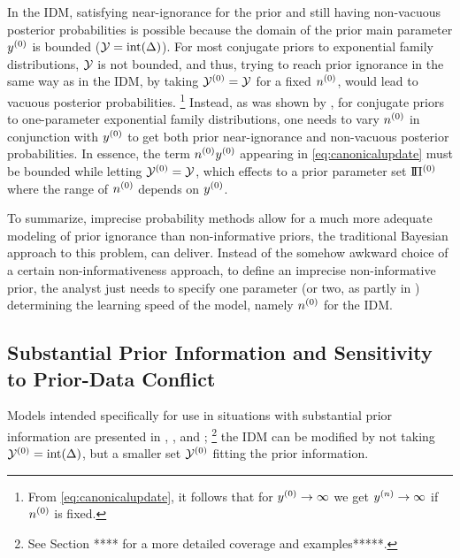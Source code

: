 In the IDM, satisfying near-ignorance for the prior and still having non-vacuous posterior probabilities is possible
because the domain of the prior main parameter $y^{(0)}$ is bounded ($\mathcal{Y} = \text{int}(\Delta)$).
For most conjugate priors to exponential family distributions, $\mathcal{Y}$ is not bounded,
and thus, trying to reach prior ignorance in the same way as in the IDM,
by taking $\mathcal{Y}^{(0)} = \mathcal{Y}$ for a fixed $n^{(0)}$, would lead to vacuous posterior probabilities.%
\footnote{From \eqref{eq:canonicalupdate}, it follows that for $y^{(0)} \rightarrow \infty$ we get $y^{(n)} \rightarrow \infty$ if $n^{(0)}$ is fixed.}
Instead, as was shown by \textcite{2012:benavolizaffalon}, for conjugate priors to one-parameter exponential family distributions,
one needs to vary $n^{(0)}$ in conjunction with $y^{(0)}$ to get both prior near-ignorance and non-vacuous posterior probabilities.
In essence, the term $n^{(0)} y^{(0)}$ appearing in \eqref{eq:canonicalupdate} must be bounded while letting $\mathcal{Y}^{(0)} = \mathcal{Y}$,
which effects to a prior parameter set $\text{I}\!\Pi^{(0)}$ where the range of $n^{(0)}$ depends on $y^{(0)}$.

To summarize, imprecise probability methods allow for a much more adequate modeling of prior ignorance
than non-informative priors, the traditional Bayesian approach to this problem, can deliver.
Instead of the somehow awkward choice of a certain non-informativeness approach,
to define an imprecise non-informative prior, the analyst just needs to specify one parameter
(or two, as partly in \cite{2012:benavolizaffalon})
determining the learning speed of the model, namely $n^{(0)}$ for the IDM.


\subsection{Substantial Prior Information and Sensitivity to Prior-Data Conflict}
\label{sec:pdc-sensitivity}

Models intended specifically for use in situations with substantial prior information are presented in
\textcite[footnote no.~10 in \S 1.1.4, and \S 7.8.3]{1991:walley}, \textcite{2005:quaeghebeurcooman}, and \textcite{Walter2009a};%
\footnote{See Section **** for a more detailed coverage and examples*****.}
the IDM can be modified by not taking $\mathcal{Y}^{(0)} = \text{int}(\Delta)$, but a smaller set $\mathcal{Y}^{(0)}$ fitting the prior information.

